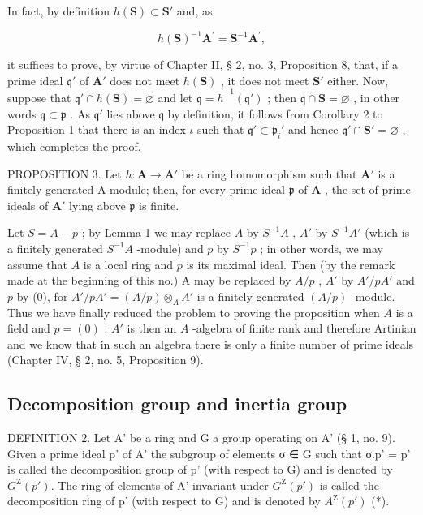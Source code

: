 In fact, by definition \(h(\mathbf{S}) \subset \mathbf{S}'\) and, as

\[
h (\mathbf {S}) ^ {- 1} \mathbf {A} ^ {\prime} = \mathbf {S} ^ {- 1} \mathbf {A} ^ {\prime},
\]

it suffices to prove, by virtue of Chapter II, § 2, no. 3, Proposition 8, that, if a prime ideal \(\mathfrak{q}'\) of \(\mathbf{A}'\) does not meet \(h(\mathbf{S})\) , it does not meet \(\mathbf{S}'\) either. Now, suppose that \(\mathfrak{q}' \cap h(\mathbf{S}) = \varnothing\) and let \(\mathfrak{q} = \bar{h}^{-1}(\mathfrak{q}')\) ; then \(\mathfrak{q} \cap \mathbf{S} = \varnothing\) , in other words \(\mathfrak{q} \subset \mathfrak{p}\) . As \(\mathfrak{q}'\) lies above \(\mathfrak{q}\) by definition, it follows from Corollary 2 to Proposition 1 that there is an index \(\iota\) such that \(\mathfrak{q}' \subset \mathfrak{p}_i'\) and hence \(\mathfrak{q}' \cap \mathbf{S}' = \varnothing\) , which completes the proof.

PROPOSITION 3. Let \(h: \mathbf{A} \to \mathbf{A}'\) be a ring homomorphism such that \(\mathbf{A}'\) is a finitely generated A-module; then, for every prime ideal \(\mathfrak{p}\) of \(\mathbf{A}\) , the set of prime ideals of \(\mathbf{A}'\) lying above \(\mathfrak{p}\) is finite.

Let \(S = A - p\) ; by Lemma 1 we may replace \(A\) by \(S^{-1}A\) , \(A'\) by \(S^{-1}A'\) (which is a finitely generated \(S^{-1}A\) -module) and \(p\) by \(S^{-1}p\) ; in other words, we may assume that \(A\) is a local ring and \(p\) is its maximal ideal. Then (by the remark made at the beginning of this no.) A may be replaced by \(A/p\) , \(A'\) by \(A'/pA'\) and \(p\) by (0), for \(A'/pA' = (A/p) \otimes_A A'\) is a finitely generated \((A/p)\) -module. Thus we have finally reduced the problem to proving the proposition when \(A\) is a field and \(p = (0)\) ; \(A'\) is then an \(A\) -algebra of finite rank and therefore Artinian and we know that in such an algebra there is only a finite number of prime ideals (Chapter IV, § 2, no. 5, Proposition 9).

\subsection{Decomposition group and inertia group}

DEFINITION 2. Let A' be a ring and G a group operating on A' (§ 1, no. 9). Given a prime ideal p' of A' the subgroup of elements σ ∈ G such that σ.p' = p' is called the decomposition group of p' (with respect to G) and is denoted by \(G^{\mathrm{Z}}(p')\). The ring of elements of A' invariant under \(G^{\mathrm{Z}}(p')\) is called the decomposition ring of p' (with respect to G) and is denoted by \(A^{\mathrm{Z}}(p')\) (*).

